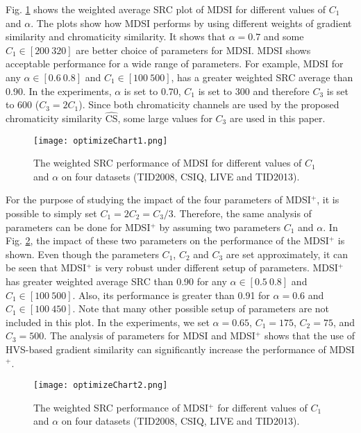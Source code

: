 Fig. \ref{fig:parameters1} shows the weighted average SRC plot of MDSI for different values of $C_1$ and $\alpha$. The plots show how MDSI performs by using different weights of gradient similarity and chromaticity similarity. It shows that $\alpha=0.7$ and some $C_1 \in [200 ~ 320]$ are better choice of parameters for MDSI. MDSI shows acceptable performance for a wide range of parameters. For example, MDSI for any $\alpha \in [0.6 ~ 0.8]$ and $C_1 \in [100 ~ 500]$, has a greater weighted SRC average than 0.90. In the experiments, $\alpha$ is set to 0.70, $C_1$ is set to 300 and therefore $C_3$ is set to 600 ($C_3 = 2C_1$). Since both chromaticity channels are used by the proposed chromaticity similarity $\widehat{\text{CS}}$, some large values for $C_3$ are used in this paper.      

\begin{figure}[htb]
\scriptsize
\begin{minipage}[b]{0.99\linewidth}
  \centering
  \centerline{\texttt{[image: optimizeChart1.png]}} 
\end{minipage}
\caption{The weighted SRC performance of MDSI for different values of $C_1$ and $\alpha$ on four datasets (TID2008, CSIQ, LIVE and TID2013).}
\label{fig:parameters1}
\end{figure}


For the purpose of studying the impact of the four parameters of MDSI$^+$, it is possible to simply set $C_1 = 2C_2 = C_3/3$. Therefore, the same analysis of parameters can be done for MDSI$^+$ by assuming two parameters $C_1$ and $\alpha$. In Fig. \ref{fig:parameters2}, the impact of these two parameters on the performance of the MDSI$^+$ is shown. Even though the parameters $C_1$, $C_2$ and $C_3$ are set approximately, it can be seen that MDSI$^+$ is very robust under different setup of parameters. MDSI$^+$ has greater weighted average SRC than 0.90 for any $\alpha \in [0.5 ~ 0.8]$ and $C_1 \in [100 ~ 500]$. Also, its performance is greater than 0.91 for $\alpha = 0.6$ and $C_1 \in [100 ~ 450]$. Note that many other possible setup of parameters are not included in this plot. In the experiments, we set $\alpha = 0.65$, $C_1 = 175$, $C_2 = 75$, and $C_3 = 500$. The analysis of parameters for MDSI and MDSI$^+$ shows that the use of HVS-based gradient similarity can significantly increase the performance of MDSI$^+$. 

 

\begin{figure}[htb]
\scriptsize
\begin{minipage}[b]{0.99\linewidth}
  \centering
  \centerline{\texttt{[image: optimizeChart2.png]}} 
\end{minipage}
\caption{The weighted SRC performance of MDSI$^+$ for different values of $C_1$ and $\alpha$ on four datasets (TID2008, CSIQ, LIVE and TID2013).}
\label{fig:parameters2}
\end{figure}




